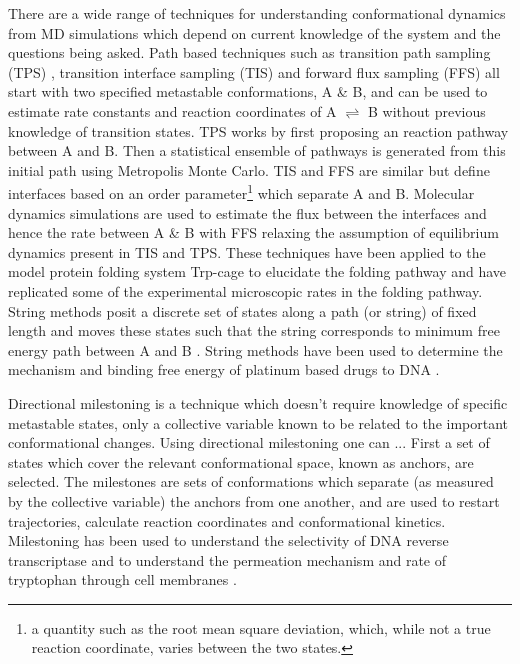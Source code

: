 There are a wide range of techniques for understanding conformational dynamics from MD simulations which depend on current knowledge of the system and the questions being asked. Path based techniques such as transition path sampling (TPS) \cite{bolhuisTRANSITIONPATHSAMPLING2002, dellagoTransitionPathSampling1999, dellagoTransitionPathSampling2002a}, transition interface sampling (TIS) \cite{vanerpNovelPathSampling2003} and forward flux sampling (FFS) 
\cite{allenSamplingRareSwitching2005} all start with two specified metastable conformations, A \& B, and can be used to estimate rate constants and reaction coordinates of A $\rightleftharpoons$ B without previous knowledge of transition states. TPS works by first proposing an reaction pathway between A and B. Then a statistical ensemble of pathways is generated from this initial path using Metropolis Monte Carlo. TIS and FFS are similar but define interfaces based on an order parameter\footnote{a quantity such as the root mean square deviation, which, while not a true reaction coordinate, varies between the two states.} which separate A and B. Molecular dynamics simulations are used to estimate the flux between the interfaces and hence the rate between A \& B with FFS relaxing the assumption of equilibrium dynamics present in TIS and TPS. These techniques have been applied \cite{juraszekSamplingMultipleFolding2006, juraszekRateConstantReaction2008,velez-vegaKineticsMechanismUnfolding2010} to the model protein folding system Trp-cage \cite{neidighDesigning20residueProtein2002} to elucidate the folding pathway and have replicated some of the experimental microscopic rates in the folding pathway. String methods posit a discrete set of states along a path (or string) of fixed length and moves these states such that the string corresponds to minimum free energy path between A and B \cite{weinane.TransitionPathTheoryPathFinding2010}. String methods have been used to determine the mechanism and binding free energy of platinum based drugs to DNA \cite{elderSequenceSpecificRecognitionCancer2012}. 

Directional milestoning \cite{faradjianComputingTimeScales2004, majekMilestoningReactionCoordinate2010,kirmizialtinRevisitingComputingReaction2011a} is a technique which doesn't require knowledge of specific metastable states, only a  collective variable known to be related to the important conformational changes. Using directional milestoning one can ... First a set of states which cover the relevant conformational space, known as anchors, are selected. The milestones are sets of conformations which separate (as measured by the collective variable) the anchors from one another, and are used to restart trajectories, calculate reaction coordinates and conformational kinetics. Milestoning has been used to understand the selectivity of DNA reverse transcriptase \cite{kirmizialtinHowConformationalDynamics2012} and to understand the permeation mechanism and rate of tryptophan through cell membranes \cite{cardenasUnassistedTransportAcetyl2012}.  

